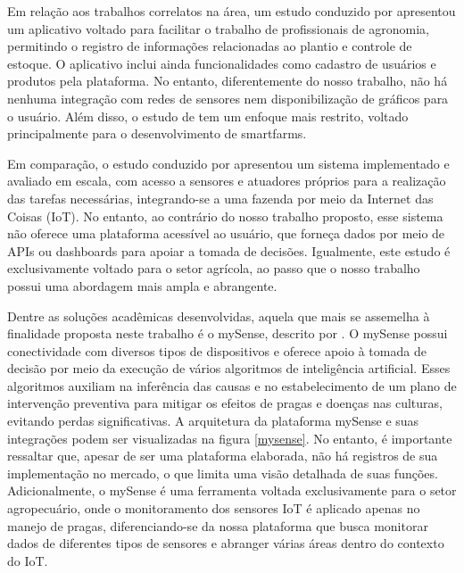 \documentclass[tcc,capa]{texufpel}
\begin{document}
Em relação aos trabalhos correlatos na área, um estudo conduzido por \citet{Khun:2018} apresentou um aplicativo voltado para facilitar o trabalho de profissionais de agronomia, permitindo o registro de informações relacionadas ao plantio e controle de estoque. O aplicativo inclui ainda funcionalidades como cadastro de usuários e produtos pela plataforma. No entanto, diferentemente do nosso trabalho, não há nenhuma integração com redes de sensores nem disponibilização de gráficos para o usuário. Além disso, o estudo de \citet{Khun:2018} tem um enfoque mais restrito, voltado principalmente para o desenvolvimento de smartfarms. 

Em comparação, o estudo conduzido por \citet{PIERAZZOLI:2019} apresentou um sistema implementado e avaliado em escala, com acesso a sensores e atuadores próprios para a realização das tarefas necessárias, integrando-se a uma fazenda por meio da Internet das Coisas (IoT). No entanto, ao contrário do nosso trabalho proposto, esse sistema não oferece uma plataforma acessível ao usuário, que forneça dados por meio de APIs ou dashboards para apoiar a tomada de decisões. Igualmente, este estudo é exclusivamente voltado para o setor agrícola, ao passo que o nosso trabalho possui uma abordagem mais ampla e abrangente.

Dentre as soluções acadêmicas desenvolvidas, aquela que mais se assemelha à finalidade proposta neste trabalho é o mySense, descrito por \citet{mysense:2018}. O mySense possui conectividade com diversos tipos de dispositivos e oferece apoio à tomada de decisão por meio da execução de vários algoritmos de inteligência artificial. Esses algoritmos auxiliam na inferência das causas e no estabelecimento de um plano de intervenção preventiva para mitigar os efeitos de pragas e doenças nas culturas, evitando perdas significativas. A arquitetura da plataforma mySense e suas integrações podem ser visualizadas na figura \ref{mysense}. No entanto, é importante ressaltar que, apesar de ser uma plataforma elaborada, não há registros de sua implementação no mercado, o que limita uma visão detalhada de suas funções. Adicionalmente, o mySense é uma ferramenta voltada exclusivamente para o setor agropecuário, onde o monitoramento dos sensores IoT é aplicado apenas no manejo de pragas, diferenciando-se da nossa plataforma que busca monitorar dados de diferentes tipos de sensores e abranger várias áreas dentro do contexto do IoT.
\end{document}
